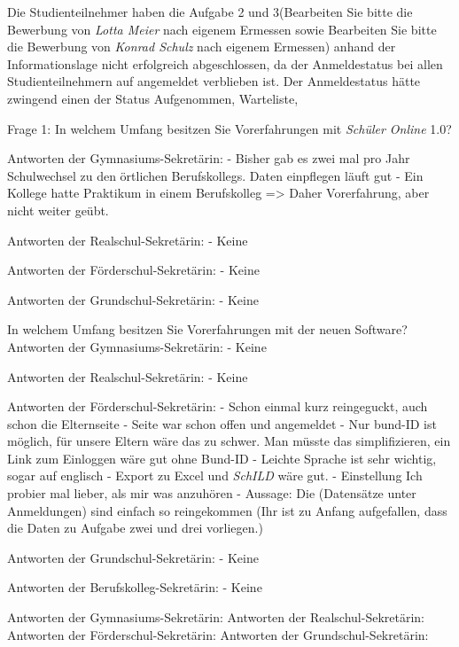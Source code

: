 Die Studienteilnehmer haben die Aufgabe 2 und 3(\glqq Bearbeiten Sie bitte die Bewerbung von \textit{Lotta Meier} nach eigenem Ermessen\grqq{} sowie \glqq Bearbeiten Sie bitte die Bewerbung von \textit{Konrad Schulz} nach eigenem Ermessen\grqq{}) anhand der Informationslage nicht erfolgreich abgeschlossen, da der Anmeldestatus bei allen Studienteilnehmern auf \glqq angemeldet\grqq{} verblieben ist. Der Anmeldestatus hätte zwingend einen der Status \glqq Aufgenommen\grqq{}, \glqq Warteliste\grqq{},\grqq{}\glqq 



Frage 1: In welchem Umfang besitzen Sie Vorerfahrungen mit \textit{Schüler Online} 1.0? 	

Antworten der Gymnasiums-Sekretärin:
- Bisher gab es zwei mal pro Jahr Schulwechsel zu den örtlichen Berufskollegs. Daten einpflegen läuft gut
- Ein Kollege hatte Praktikum in einem Berufskolleg => Daher Vorerfahrung, aber nicht weiter geübt.

Antworten der Realschul-Sekretärin:
- Keine	

Antworten der Förderschul-Sekretärin:
- Keine

Antworten der Grundschul-Sekretärin:
- Keine


In welchem Umfang besitzen Sie Vorerfahrungen mit der neuen Software?		
Antworten der Gymnasiums-Sekretärin:
- Keine				

Antworten der Realschul-Sekretärin:
- Keine				

Antworten der Förderschul-Sekretärin:
- Schon einmal kurz reingeguckt, auch schon die Elternseite
- Seite war schon offen und angemeldet	
- Nur bund-ID ist möglich, für unsere Eltern wäre das zu schwer. Man müsste das simplifizieren, ein Link zum Einloggen wäre gut ohne Bund-ID
- Leichte Sprache ist sehr wichtig, sogar auf englisch
- Export zu Excel und \textit{SchILD} wäre gut.
- Einstellung \glqq Ich probier mal lieber, als mir was anzuhören\grqq{}
- Aussage: \glqq Die (Datensätze unter Anmeldungen) sind einfach so reingekommen\grqq{} (Ihr ist zu Anfang aufgefallen, dass die Daten zu Aufgabe zwei und drei vorliegen.)			

Antworten der Grundschul-Sekretärin:
- Keine		

Antworten der Berufskolleg-Sekretärin:
- Keine				







Antworten der Gymnasiums-Sekretärin:
Antworten der Realschul-Sekretärin:
Antworten der Förderschul-Sekretärin:
Antworten der Grundschul-Sekretärin:
